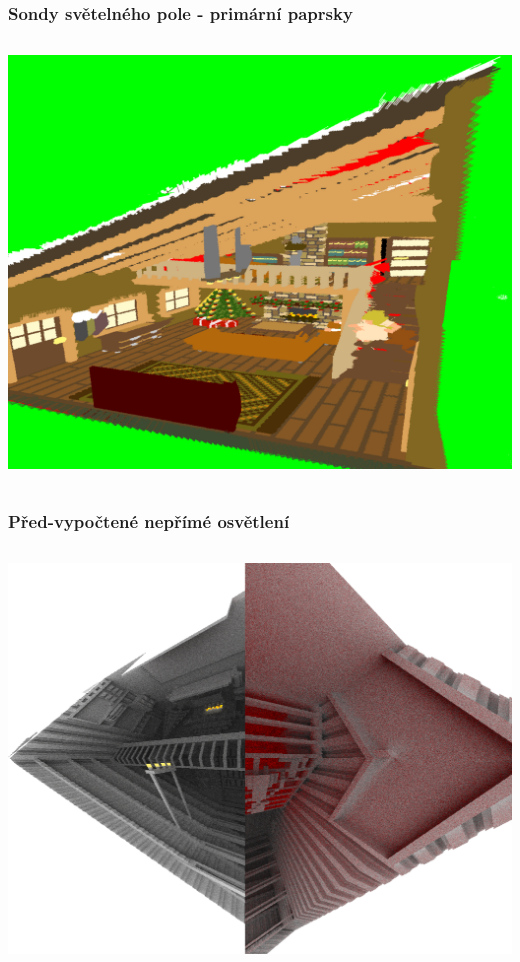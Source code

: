\documentclass[10pt,xcolor=pdflatex,hyperref={unicode}]{beamer}
\begin{document}
\begin{frame}\frametitle{Sondy světelného pole - primární paprsky}
    \begin{column}{\textwidth}
        \includegraphics[width=\textwidth]{img/probe_scene_render.png}
    \end{column}
\end{frame}

\begin{frame}\frametitle{Před-vypočtené nepřímé osvětlení}
    \begin{column}{\textwidth}
        \includegraphics[width=\textwidth]{img/indirect_probe.png}
    \end{column}
\end{frame}
\end{document}

